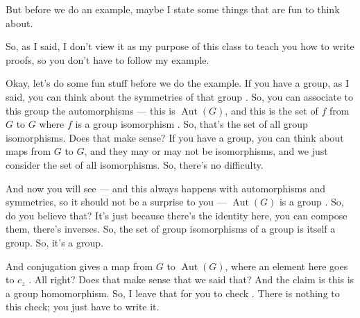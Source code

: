 \begin{speech}[00:23:12 - 00:25:15]
But before we do an example, maybe I state some things that are fun to think about. 

So, as I said, I don't view it as my purpose of this class to teach you how to write proofs, so you don't have to follow my example.

Okay, let's do some fun stuff before we do the example. If you have a group, as I said, you can think about the symmetries of that group . So, you can associate to this group the automorphisms --- this is $\operatorname{Aut}(G)$, and this is the set of $f$ from $G$ to $G$ where $f$ is a group isomorphism . So, that's the set of all group isomorphisms. Does that make sense? If you have a group, you can think about maps from $G$ to $G$, and they may or may not be isomorphisms, and we just consider the set of all isomorphisms. So, there's no difficulty.

And now you will see --- and this always happens with automorphisms and symmetries, so it should not be a surprise to you --- $\operatorname{Aut}(G)$ is a group . So, do you believe that? It's just because there's the identity here, you can compose them, there's inverses. So, the set of group isomorphisms of a group is itself a group. So, it's a group.

And conjugation gives a map from $G$ to $\operatorname{Aut}(G)$, where an element here goes to $c_z$ . All right? Does that make sense that we said that? And the claim is this is a group homomorphism. So, I leave that for you to check . There is nothing to this check; you just have to write it.
\end{speech}

